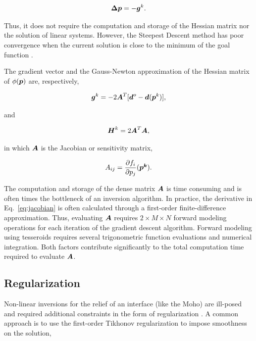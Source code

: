 \documentclass[extra]{gji}
\newcommand{\eq}[1]{Eq.~\ref{eq:#1}}
\newcommand{\mbf}[1]{\hbox{\mathversion{bold}$#1$}}
\begin{document}
\begin{equation}
    \mbf{\Delta p} = -\mbf{g}^k.
    \label{eq:steepest}
\end{equation}

\noindent
Thus, it does not require the computation and storage of the Hessian matrix
nor the solution of linear systems.
However, the Steepest Descent method has poor convergence when the
current solution is close to the minimum of the goal function
\citep{kelley_iterative_1987}.

The gradient vector and the Gauss-Newton approximation of the Hessian matrix
of $\phi(\mbf{p})$ are, respectively,

\begin{equation}
    \mbf{g}^k = -2\mbf{A}^T[\mbf{d}^o - \mbf{d}(\mbf{p}^k)],
    \label{eq:gradient}
\end{equation}

\noindent
and

\begin{equation}
    \mbf{H}^k = 2\mbf{A}^T\mbf{A},
    \label{eq:hessian}
\end{equation}

\noindent in which
$\mbf{A}$ is the Jacobian or sensitivity matrix,

\begin{equation}
    A_{ij} = \dfrac{\partial f_i}{\partial p_j}(\mbf{p^k}).
    \label{eq:jacobian}
\end{equation}

The computation and storage of the dense matrix $\mbf{A}$ is time consuming
and is often times the bottleneck of an inversion algorithm.
In practice, the derivative in \eq{jacobian} is often calculated through a
first-order finite-difference approximation.
Thus, evaluating $\mbf{A}$ requires $2\times M \times N$ forward modeling
operations for each iteration of the gradient descent algorithm.
Forward modeling using tesseroids requires several trigonometric function
evaluations and numerical integration.
Both factors contribute significantly to the total computation time required to
evaluate $\mbf{A}$.



\subsection{Regularization}

Non-linear inversions for the relief of an interface (like
the Moho) are ill-posed and required additional constraints in the form of
regularization \citep{silva_potential-field_2001}.
A common approach is to use the first-order Tikhonov regularization to impose
smoothness on the solution,
\end{document}
